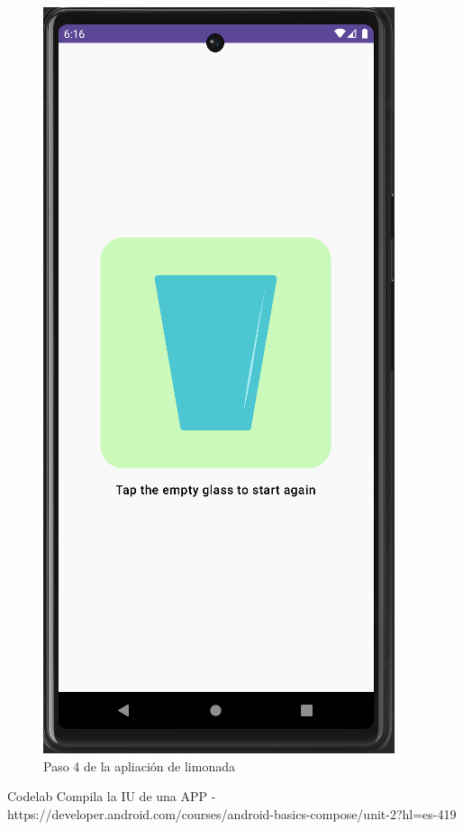 \documentclass{article}
\begin{document}
    \begin{figure}[H]
        \centerline{\includegraphics[scale=0.2]{step4.png}}
        \caption{Paso 4 de la apliación de limonada}
        \label{fig:step4}
    \end{figure}

    \begin{thebibliography}{}
         Codelab Compila la IU de una APP - https://developer.android.com/courses/android-basics-compose/unit-2?hl=es-419
    \end{thebibliography}
        
\end{document}
